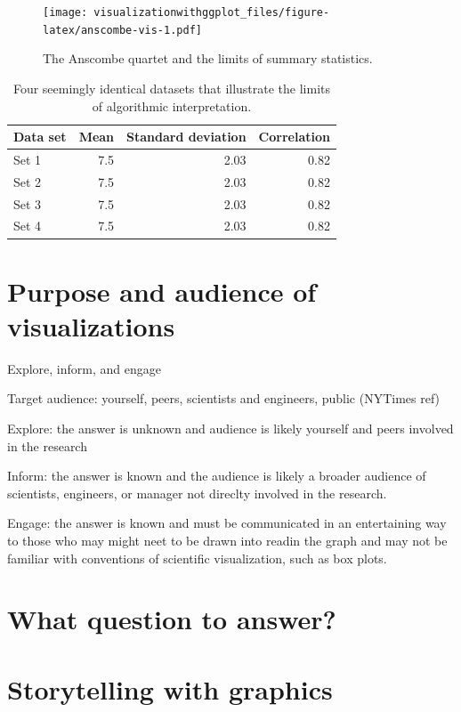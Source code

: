 \documentclass[]{krantz}
\theoremstyle{definition}
\theoremstyle{definition}
\theoremstyle{definition}
\theoremstyle{remark}
\begin{document}
\begin{figure}
\centering
\texttt{[image: visualizationwithggplot\_files/figure-latex/anscombe-vis-1.pdf]}
\caption{\label{fig:anscombe-vis}The Anscombe quartet and the limits of
summary statistics.}
\end{figure}

\begin{table}[t]

\caption{\label{tab:anscombe-tab}Four seemingly identical datasets that illustrate the limits of algorithmic interpretation.}
\centering
\begin{tabular}{lrrr}
\toprule
Data set & Mean & Standard deviation & Correlation\\
\midrule
Set 1 & 7.5 & 2.03 & 0.82\\
Set 2 & 7.5 & 2.03 & 0.82\\
Set 3 & 7.5 & 2.03 & 0.82\\
Set 4 & 7.5 & 2.03 & 0.82\\
\bottomrule
\end{tabular}
\end{table}

\section{Purpose and audience of
visualizations}\label{purpose-and-audience-of-visualizations}

Explore, inform, and engage \citep{Gelman2013}

Target audience: yourself, peers, scientists and engineers, public
(NYTimes ref)

Explore: the answer is unknown and audience is likely yourself and peers
involved in the research

Inform: the answer is known and the audience is likely a broader
audience of scientists, engineers, or manager not direclty involved in
the research.

Engage: the answer is known and must be communicated in an entertaining
way to those who may might neet to be drawn into readin the graph and
may not be familiar with conventions of scientific visualization, such
as box plots.

\section{What question to answer?}\label{what-question-to-answer}

\section{Storytelling with graphics}\label{storytelling-with-graphics}
\end{document}
